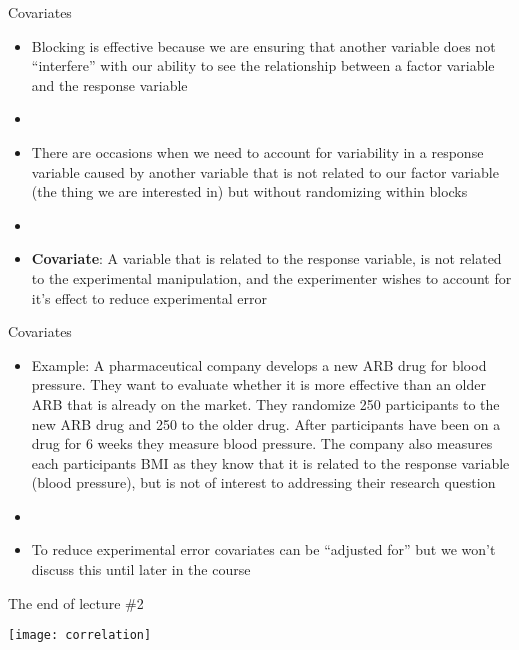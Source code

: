 \documentclass[xcolor=dvipsnames]{beamer}
\begin{document}
\begin{frame}{Covariates}
	\begin{itemize}
		\item Blocking is effective because we are ensuring that another variable does not ``interfere'' with our ability to see the relationship between a factor variable and the response variable \pause
		\item[]
		\item There are occasions when we need to account for variability in a response variable caused by another variable that is not related to our factor variable (the thing we are interested in) but without randomizing within blocks \pause
		\item[]
		\item \textbf{Covariate}: A variable that is related to the response variable, is not related to the experimental manipulation, and the experimenter wishes to account for it's effect to reduce experimental error
	\end{itemize}
\end{frame}

\begin{frame}{Covariates}
	\begin{itemize}
		\item Example: A pharmaceutical company develops a new ARB drug for blood pressure. They want to evaluate whether it is more effective than an older ARB that is already on the market. They randomize 250 participants to the new ARB drug and 250 to the older drug. After participants have been on a drug for 6 weeks they measure blood pressure. The company also measures each participants BMI as they know that it is related to the response variable (blood pressure), but is not of interest to addressing their research question \pause
		\item[]
		\item To reduce experimental error covariates can be ``adjusted for'' but we won't discuss this until later in the course
	\end{itemize}
\end{frame}

\begin{frame}{The end of lecture \#2}
	\begin{center}
		\texttt{[image: correlation]}
	\end{center}
\end{frame}
\end{document}
